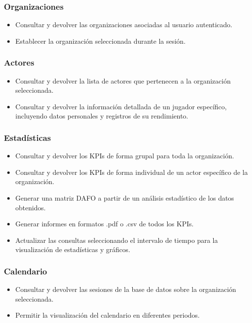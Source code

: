\subsubsection{Organizaciones}
\begin{itemize}
    \item Consultar y devolver las organizaciones asociadas al usuario autenticado.
    \item Establecer la organización seleccionada durante la sesión.
\end{itemize}
\subsubsection{Actores}
\begin{itemize}
    \item Consultar y devolver la lista de actores que pertenecen a la organización seleccionada.
    \item Consultar y devolver la información detallada de un jugador específico, incluyendo datos personales y registros de su rendimiento.
\end{itemize}
\subsubsection{Estadísticas}
\begin{itemize}
    \item Consultar y devolver los KPIs de forma grupal para toda la organización.
    \item Consultar y devolver los KPIs de forma individual de un actor específico de la organización.
    \item Generar una matriz DAFO a partir de un análisis estadístico de los datos obtenidos.
    \item Generar informes en formatos .pdf o .csv de todos los KPIs.
    \item Actualizar las consultas seleccionando el intervalo de tiempo para la visualización de estadísticas y gráficos.
\end{itemize}
\subsubsection{Calendario}
\begin{itemize}
    \item Consultar y devolver las sesiones de la base de datos sobre la organización seleccionada.
    \item Permitir la visualización del calendario en diferentes periodos.
\end{itemize}
